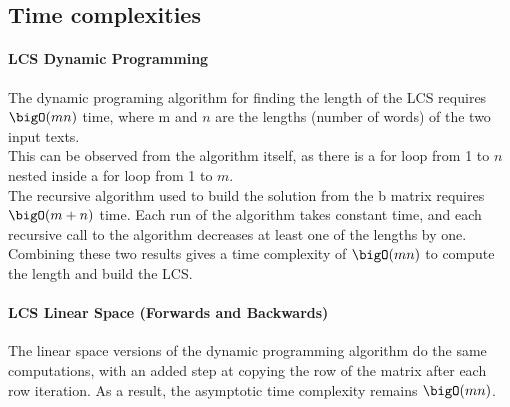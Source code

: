 \subsection{Time complexities}
	\paragraph{LCS Dynamic Programming}
		The dynamic programing algorithm for finding the length of the LCS requires $\bigO(mn)$ time, where m and $n$ are the lengths (number of words) of the two input texts. \\
		This can be observed from the algorithm itself, as there is a for loop from 1 to $n$ nested inside a for loop from 1 to $m$. \\
		The recursive algorithm used to build the solution from the b matrix requires $\bigO(m+n)$ time. Each run of the algorithm takes constant time, and each recursive call to the algorithm decreases at least one of the lengths by one. \\
		Combining these two results gives a time complexity of $\bigO(mn)$ to compute the length and build the LCS.

	\paragraph{LCS Linear Space (Forwards and Backwards)}
		The linear space versions of the dynamic programming algorithm do the same computations, with an added step at copying the row of the matrix after each row iteration. As a result, the asymptotic time complexity remains $\bigO(mn)$.

